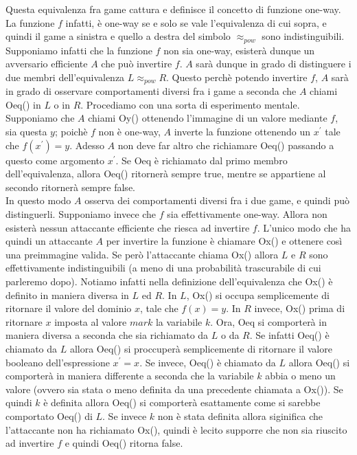 \documentclass[a4paper,openright,twoside,12pt]{report}
\begin{document}
Questa equivalenza fra game cattura e definisce il concetto di funzione one-way. La funzione $f$ infatti, \`e one-way se e solo se vale l'equivalenza di cui sopra, 
e quindi il game a sinistra e quello a destra del simbolo \textbf{$\approx _{pow}$} sono indistinguibili.
Supponiamo infatti che la funzione $f$ non sia one-way, esister\`a dunque un avversario efficiente $A$ 
che pu\`o invertire $f$. $A$ sar\`a dunque in grado di distinguere i due membri dell'equivalenza $L \approx_{pow} R$. 
Questo perch\`e potendo invertire $f$, $A$ sar\`a in grado di osservare comportamenti diversi fra i game a seconda che $A$ chiami Oeq() in $L$ o in $R$.
Procediamo con una sorta di esperimento mentale.\\ 
Supponiamo che $A$ chiami Oy() ottenendo l'immagine di un valore mediante $f$, sia questa $y$; poich\`e $f$ non \`e one-way, 
$A$ inverte la funzione ottenendo un $x^{'}$ tale che $f(x^{'})= y$.
Adesso $A$ non deve far altro che richiamare Oeq() passando a questo come argomento $x^{'}$. Se Oeq \`e richiamato dal primo membro dell'equivalenza, 
allora Oeq()  ritorner\`a sempre true, mentre se appartiene al secondo ritorner\`a sempre false.\\
In questo modo $A$ osserva dei comportamenti diversi fra i due game, e quindi pu\`o distinguerli. 
Supponiamo invece che $f$ sia effettivamente one-way. Allora non esister\`a nessun attaccante efficiente che riesca ad invertire $f$.
L'unico modo che ha quindi un attaccante $A$ per invertire la funzione \`e chiamare Ox() e ottenere cos\`i una preimmagine valida. 
Se però l'attaccante chiama Ox() allora $L$ e $R$ sono effettivamente indistinguibili (a meno di una probabilit\`a trascurabile di cui parleremo dopo).
Notiamo infatti nella definizione dell'equivalenza che Ox() \`e definito in maniera diversa in $L$ ed $R$.
In $L$, Ox() si occupa semplicemente di ritornare il valore del dominio $x$, tale che $f(x)=y$. 
In $R$ invece, Ox() prima di ritornare $x$ imposta al valore $mark$ la variabile $k$.
Ora, Oeq si comporter\`a in maniera diversa a seconda che sia richiamato da $L$ o da $R$.
Se infatti Oeq() \`e chiamato da $L$ allora Oeq() si proccuper\`a semplicemente di ritornare il valore booleano dell'espressione $x^{'}=x$.
Se invece, Oeq() \`e chiamato da $L$ allora Oeq() si comporter\`a in maniera differente a seconda che la variabile $k$ abbia o meno un valore 
(ovvero sia stata o meno definita da una precedente chiamata a Ox()). Se quindi $k$ \`e definita allora Oeq() si comporter\`a esattamente come si sarebbe comportato Oeq() di $L$.
Se invece $k$ non \`e stata definita allora siginifica che l'attaccante non ha richiamato Ox(), quindi \`e lecito supporre che non sia riuscito ad invertire $f$ e quindi Oeq() ritorna false.\\
\end{document}
